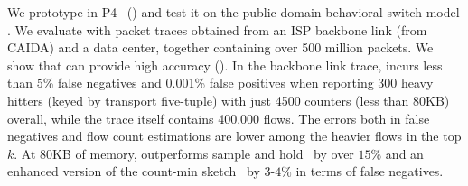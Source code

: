 We prototype \TheSystem  in P4~\cite{bosshart2014p4} () and
test it on the public-domain behavioral switch model \cite{p4-bm}. %
We evaluate \TheSystem with packet traces obtained from an ISP backbone link
(from CAIDA) and a data
center, together containing over 500 million packets.
%
We show that \TheSystem can provide high accuracy
().
%
In the backbone link trace, \TheSystem incurs less than 5\% false negatives and
0.001\% false positives when reporting 300 heavy hitters (keyed by transport
five-tuple) with just 4500 counters (less than 80KB) overall, while the trace
itself contains 400,000 flows.
%
The errors both in false negatives and flow count estimations are lower among
the heavier flows in the top $k$.
%
At 80KB of memory, \TheSystem outperforms
sample and hold~\cite{estan2002new} by over $15\%$ and an enhanced version of the count-min sketch~\cite{cormode2005improved}
by $3$-$4\%$ in terms of false negatives.

%








